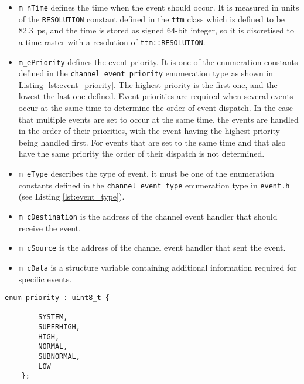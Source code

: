 \begin{itemize}

\item \texttt{m\_nTime} defines the time when the event should occur. It is measured in units of the \texttt{RESOLUTION} constant defined in the \texttt{ttm} class which is defined to be 82.3~ps, and the time is stored as signed 64-bit integer, so it is discretised to a time raster with a resolution of \texttt{ttm::RESOLUTION}.

\item \texttt{m\_ePriority} defines the event priority. It is one of the enumeration constants defined in the \texttt{channel\_event\_priority} enumeration type as shown in Listing \ref{lst:event_priority}. The highest priority is the first one, and the lowest the last one defined. Event priorities are required when several events occur at the same time to determine the order of event dispatch. In the case that multiple events are set to occur at the same time, the events are handled in the order of their priorities, with the event having the highest priority being handled first. For events that are set to the same time and that also have the same priority the order of their dispatch is not determined.

\item \texttt{m\_eType} describes the type of event, it must be one of the enumeration constants defined in the \texttt{channel\_event\_type} enumeration type in \texttt{event.h} (see Listing \ref{lst:event_type}).

\item \texttt{m\_cDestination} is the address of the channel event handler that should receive the event.

\item \texttt{m\_cSource} is the address of the channel event handler that sent the event.

\item \texttt{m\_cData} is a structure variable containing additional information required for specific events.

\end{itemize}

\begin{lstlisting}[caption={Definition of the \texttt{event\_priority} enumeration type}, captionpos=b, label={lst:event_priority}]
    enum priority : uint8_t {
        
        SYSTEM,
        SUPERHIGH,
        HIGH,
        NORMAL,
        SUBNORMAL,
        LOW
    };
\end{lstlisting}


